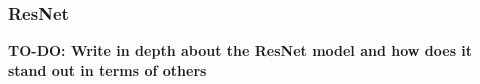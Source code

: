 \subsubsection{ResNet}
\textbf{TO-DO: Write in depth about the ResNet model and how does it stand out in terms of others}